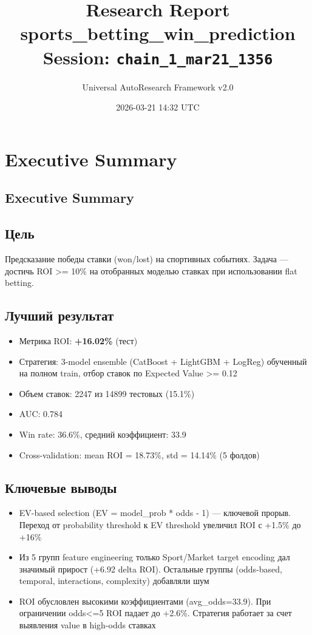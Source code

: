 \documentclass[12pt,a4paper]{article}
\title{
    \Large\textbf{Research Report}\\[0.5em]
    \large sports\_betting\_win\_prediction\\[0.3em]
    \normalsize Session: \texttt{chain\_1\_mar21\_1356}
}
\author{Universal AutoResearch Framework v2.0}
\date{2026-03-21 14:32 UTC}
\begin{document}
\maketitle
\tableofcontents
\newpage


\section{Executive Summary}

\subsection{Executive Summary}

\subsection{Цель}
Предсказание победы ставки (won/lost) на спортивных событиях. Задача — достичь ROI >= 10\% на отобранных моделью ставках при использовании flat betting.

\subsection{Лучший результат}
\begin{itemize}
  \item Метрика ROI: \textbf{+16.02\%} (тест)
  \item Стратегия: 3-model ensemble (CatBoost + LightGBM + LogReg) обученный на полном train, отбор ставок по Expected Value >= 0.12
  \item Объем ставок: 2247 из 14899 тестовых (15.1\%)
  \item AUC: 0.784
  \item Win rate: 36.6\%, средний коэффициент: 33.9
  \item Cross-validation: mean ROI = 18.73\%, std = 14.14\% (5 фолдов)
\end{itemize}

\subsection{Ключевые выводы}
\begin{itemize}
  \item EV-based selection (EV = model\_prob * odds - 1) — ключевой прорыв. Переход от probability threshold к EV threshold увеличил ROI с +1.5\% до +16\%
  \item Из 5 групп feature engineering только Sport/Market target encoding дал значимый прирост (+6.92 delta ROI). Остальные группы (odds-based, temporal, interactions, complexity) добавляли шум
  \item ROI обусловлен высокими коэффициентами (avg\_odds=33.9). При ограничении odds<=5 ROI падает до +2.6\%. Стратегия работает за счет выявления value в high-odds ставках
\end{itemize}
\end{document}
